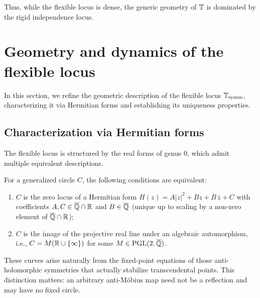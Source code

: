 Thus, while the flexible locus is dense, the generic geometry of $\mathbb{T}$ is dominated by the rigid independence locus.

\section{Geometry and dynamics of the flexible locus}\label{grct:sec:geometric-interpretations}

In this section, we refine the geometric description of the flexible locus $\mathbb{T}_{\mathrm{symm}}$, characterizing it via Hermitian forms and establishing its uniqueness properties.

\subsection{Characterization via Hermitian forms}

The flexible locus is structured by the real forms of genus 0, which admit multiple equivalent descriptions.

\begin{remark}\label{grct:rem:equiv-alg-circle}
	For a generalized circle $C$, the following conditions are equivalent:
	\begin{enumerate}[itemsep=0.2ex,topsep=0.3ex,leftmargin=1.75em]
		\item $C$ is the zero locus of a Hermitian form $H(z)=A|z|^2+Bz+\overline{B}\,\overline{z}+C$ with coefficients $A,C\in\overline{\mathbb{Q}}\cap\mathbb{R}$ and $B\in\overline{\mathbb{Q}}$ (unique up to scaling by a non-zero element of $\overline{\mathbb{Q}}\cap\mathbb{R}$);
		\item $C$ is the image of the projective real line under an algebraic automorphism, i.e., $C=M(\mathbb{R}\cup\{\infty\})$ for some $M\in\operatorname{PGL}(2,\overline{\mathbb{Q}})$.
	\end{enumerate}
	\end{remark}

These curves arise naturally from the fixed-point equations of those anti-holomorphic symmetries that actually stabilize transcendental points. This distinction matters: an arbitrary anti-Möbius map need not be a reflection and may have no fixed circle.

